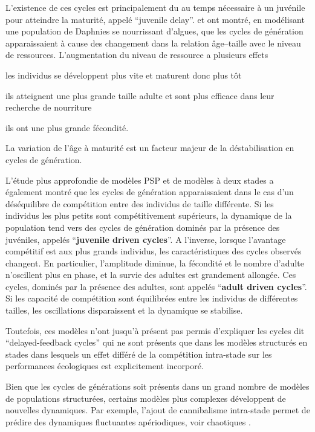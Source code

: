 L'existence de ces cycles est principalement du au temps nécessaire à
un juvénile pour atteindre la maturité, appelé ``juvenile delay''.
\textcite{de-roos1990a} et \textcite{de-roos1997a} ont montré, en modélisant une
population de Daphnies se nourrissant d'algues, que les cycles de génération
apparaissaient à cause des changement dans la relation âge--taille avec
le niveau de ressources. L'augmentation du niveau de ressource a plusieurs
effets \begin{enumerate*}[label=(\roman*), before=\unskip{ : }, itemjoin={{ ; }},
itemjoin*={{ ; et }}]\item les individus se développent plus vite et maturent
donc plus tôt \item ils atteignent une plus grande taille adulte et sont plus
efficace dans leur recherche de nourriture \item ils ont une plus grande
fécondité.\end{enumerate*} La variation de l'âge à maturité est un facteur
majeur de la déstabilisation en cycles de génération.

\label{competPopStru}L'étude plus approfondie de modèles PSP et de modèles à
deux stades \autocite[juvéniles et adultes, ][]{de-roos2003a} a également montré que les
cycles de génération apparaissaient dans le cas d'un déséquilibre de compétition
entre des individus de taille différente. Si les individus les plus petits sont
compétitivement supérieurs, la dynamique de la population tend vers des cycles
de génération dominés par la présence des juvéniles, appelés ``\textbf{juvenile
driven cycles}''. A l'inverse, lorsque l'avantage compétitif est aux plus grands
individus, les caractéristiques des cycles observés changent.
En particulier, l'amplitude diminue, la fécondité et le nombre d'adulte
n'oscillent plus en phase, et la survie des adultes est grandement allongée. Ces
cycles, dominés par la présence des adultes, sont appelés ``\textbf{adult driven
cycles}''.
Si les capacité de compétition sont équilibrées entre les individus de
différentes tailles, les oscillations disparaissent et la dynamique se
stabilise. 

Toutefois, ces modèles n'ont jusqu'à présent pas permis d'expliquer
les cycles dit ``delayed-feedback cycles'' qui ne sont présents que dans les
modèles structurés en stades dans lesquels un effet différé de la compétition
intra-stade sur les performances écologiques est explicitement incorporé.

Bien que les cycles de générations soit présents dans un grand nombre de modèles
de populations structurées, certains modèles plus complexes développent de
nouvelles dynamiques. Par exemple, l'ajout de cannibalisme intra-stade permet de
prédire des dynamiques fluctuantes apériodiques, voir chaotiques
\autocites{costantino1997a,dennis1997a}.

